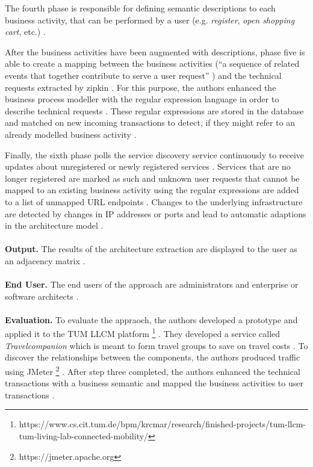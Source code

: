 The fourth phase is responsible for defining semantic descriptions to each business activity, that can be performed by a user (e.g. \textit{register}, \textit{open shopping cart}, etc.) \cite{Kleehaus2018}.

After the business activities have been augmented with descriptions, phase five is able to create a mapping between the business activities (``a sequence of related events that together contribute to serve a user request'' \cite{Kleehaus2018}) and the technical requests extracted by zipkin \cite{Kleehaus2018}.
For this purpose, the authors enhanced the business process modeller with the regular expression language in order to describe technical requests \cite{Kleehaus2018}.
These regular expressions are stored in the database and matched on new incoming transactions to detect, if they might refer to an already modelled business activity \cite{Kleehaus2018}.

Finally, the sixth phase polls the service discovery service continuously to receive updates about unregistered or newly registered services \cite{Kleehaus2018}.
Services that are no longer registered are marked as such and unknown user requests that cannot be mapped to an existing business activity using the regular expressions are added to a list of unmapped URL endpoints \cite{Kleehaus2018}.
Changes to the underlying infrastructure are detected by changes in IP addresses or ports and lead to automatic adaptions in the architecture model \cite{Kleehaus2018}.
\\ \\
\textbf{Output.}
The results of the architecture extraction are displayed to the user as an adjacency matrix \cite{Kleehaus2018}.
\\ \\
\textbf{End User.}
The end users of the approach are administrators and enterprise or software architects \cite{Kleehaus2018}.
\\ \\
\textbf{Evaluation.}
To evaluate the appraoch, the authors developed a prototype and applied it to the TUM LLCM platform \footnote{https://www.cs.cit.tum.de/bpm/krcmar/research/finished-projects/tum-llcm-tum-living-lab-connected-mobility/} \cite{Kleehaus2018}.
They developed a service called \textit{Travelcompanion} which is meant to form travel groups to save on travel costs \cite{Kleehaus2018}.
To discover the relationships between the components, the authors produced traffic using JMeter \footnote{https://jmeter.apache.org} \cite{Kleehaus2018}.
After step three completed, the authors enhanced the technical transactions with a business semantic and mapped the business activities to user transactions \cite{Kleehaus2018}.
